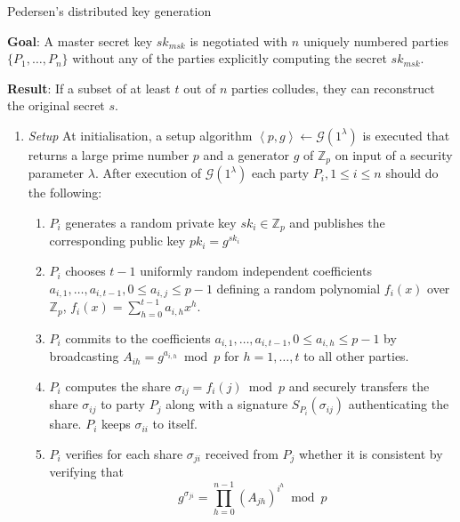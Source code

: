 \begin{algorithm}
\caption{Pedersen's distributed key generation~\cite{art:Pedersen91a}}
\label{alg:pedersen_dkg}
\begin{description}
 \item \textbf{Goal}: A master secret key $sk_{msk}$ is negotiated with $n$ uniquely numbered parties $\{ P_1, \ldots, P_n \}$ without any of the parties explicitly computing the secret $sk_{msk}$.
 
 \item \textbf{Result}: If a subset of at least $t$ out of $n$ parties colludes, they can reconstruct the original secret $s$.
\end{description}
 \begin{enumerate}
  \item \textit{Setup} At initialisation, a setup algorithm $\left< p, g \right> \leftarrow \mathcal{G} \left( 1^{\lambda} \right)$ is executed that returns a large prime number $p$ and a generator $g$ of $\mathbb{Z}_p$ on input of a security parameter $\lambda$. After execution of $\mathcal{G} \left( 1^{\lambda} \right)$ each party $P_i, 1 \leq i \leq n$ should do the following:
   \begin{enumerate}
    \item $P_i$ generates a random private key $sk_i \in \mathbb{Z}_p$ and publishes the corresponding public key $pk_i = g^{sk_i}$
    \item $P_i$ chooses $t-1$ uniformly random independent coefficients $a_{i,1}, \ldots, a_{i,t-1}, 0 \leq a_{i,j} \leq p-1$ defining a random polynomial $f_i \left( x \right)$ over $\mathbb{Z}_p$, $f_i \left( x \right) = \sum^{t-1}_{h=0} a_{i,h} x^h$.
    \item $P_i$ commits to the coefficients $a_{i,1}, \ldots, a_{i,t-1}, 0 \leq a_{i,h} \leq p-1$ by broadcasting $A_{ih} = g^{a_{i,h}} \bmod p$ for $h = 1, \ldots, t$ to all other parties.
    \item $P_i$ computes the share $\sigma_{ij} = f_i \left( j \right) \bmod p$ and securely transfers the share $\sigma_{ij}$ to party $P_j$ along with a signature $S_{P_i} \left( \sigma_{ij} \right)$ authenticating the share. $P_i$ keeps $\sigma_{ii}$ to itself.
    \item $P_i$ verifies for each share $\sigma_{ji}$ received from $P_j$ whether it is consistent by verifying that
    \begin{equation*}
     g^{\sigma_{ji}} = \prod_{h=0}^{n-1} \left( A_{jh} \right)^{i^h} \bmod p
    \end{equation*}

\end{enumerate}
\end{enumerate}
\end{algorithm}
